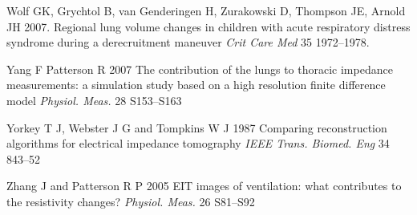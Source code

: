 \documentclass[12pt]{iopart}
\begin{document}
\item[]
Wolf GK, Grychtol B, van Genderingen H, Zurakowski D, Thompson JE, Arnold JH
2007.
Regional lung volume changes in children with acute respiratory distress
syndrome during a derecruitment maneuver
{\em Crit Care Med}
35 1972--1978.

\item[]
Yang F  Patterson R 2007
The contribution of the lungs to thoracic impedance
measurements: a simulation study based on a high
resolution finite difference model
{\em Physiol. Meas.}
28 S153--S163

\item[]
Yorkey T J, Webster J G and Tompkins W J 1987
Comparing reconstruction algorithms for electrical
impedance tomography
{\em IEEE Trans. Biomed. Eng}
34 843--52


\item[]
Zhang J and Patterson R P 2005 EIT images of ventilation: what
contributes to the resistivity changes?
{\em Physiol. Meas.}
 26 S81--S92

\endrefs
\end{document}
